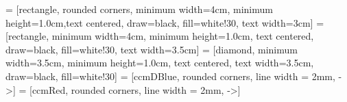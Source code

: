  = [rectangle, rounded corners, minimum width=4cm, minimum height=1.0cm,text centered, draw=black, fill=white!30, text width=3cm]
 = [rectangle, minimum width=4cm, minimum height=1.0cm, text centered, draw=black, fill=white!30, text width=3.5cm]
 = [diamond, minimum width=3.5cm, minimum height=1.0cm,  text centered, text width=3.5cm, draw=black, fill=white!30]
 = [ccmDBlue, rounded corners, line width = 2mm, ->]
 = [ccmRed, rounded corners, line width = 2mm, ->]

